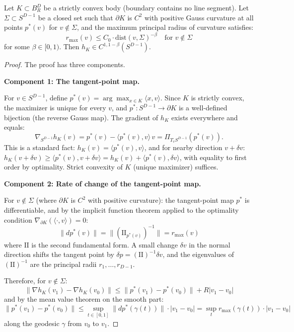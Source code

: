 \begin{theorem}
\label{thm:curv-reg-sc}
Let $K \subset B_R^D$ be a strictly convex body (boundary contains no line segment). Let $\Sigma \subset S^{D-1}$ be a closed set such that $\partial K$ is $C^2$ with positive Gauss curvature at all points $p^*(v)$ for $v \notin \Sigma$, and the maximum principal radius of curvature satisfies:
\[
  r_{\max}(v) \leq C_0 \cdot \mathrm{dist}(v, \Sigma)^{-\beta} \quad \text{for } v \notin \Sigma
\]
for some $\beta \in [0, 1)$. Then $h_K \in C^{1, 1-\beta}(S^{D-1})$.
\end{theorem}

\begin{proof}
The proof has three components.

\textbf{Component 1: The tangent-point map.}

For $v \in S^{D-1}$, define $p^*(v) = \arg\max_{x \in K} \langle x, v \rangle$. Since $K$ is strictly convex, the maximizer is unique for every $v$, and $p^* : S^{D-1} \to \partial K$ is a well-defined bijection (the reverse Gauss map). The gradient of $h_K$ exists everywhere and equals:
\[
  \nabla_{S^{D-1}} h_K(v) = p^*(v) - \langle p^*(v), v \rangle \, v = \Pi_{T_v S^{D-1}}(p^*(v)).
\]
This is a standard fact: $h_K(v) = \langle p^*(v), v \rangle$, and for nearby direction $v + \delta v$: $h_K(v + \delta v) \geq \langle p^*(v), v + \delta v \rangle = h_K(v) + \langle p^*(v), \delta v \rangle$, with equality to first order by optimality. Strict convexity of $K$ (unique maximizer) suffices.

\textbf{Component 2: Rate of change of the tangent-point map.}

For $v \notin \Sigma$ (where $\partial K$ is $C^2$ with positive curvature): the tangent-point map $p^*$ is differentiable, and by the implicit function theorem applied to the optimality condition $\nabla_{\partial K}(\langle \cdot, v \rangle) = 0$:
\[
  \|dp^*(v)\| = \|(\mathrm{II}_{p^*(v)})^{-1}\| = r_{\max}(v)
\]
where $\mathrm{II}$ is the second fundamental form. A small change $\delta v$ in the normal direction shifts the tangent point by $\delta p = (\mathrm{II})^{-1} \delta v$, and the eigenvalues of $(\mathrm{II})^{-1}$ are the principal radii $r_1, \ldots, r_{D-1}$.

Therefore, for $v \notin \Sigma$:
\[
  \|\nabla h_K(v_1) - \nabla h_K(v_0)\| \leq \|p^*(v_1) - p^*(v_0)\| + R |v_1 - v_0|
\]
and by the mean value theorem on the smooth part:
\[
  \|p^*(v_1) - p^*(v_0)\| \leq \sup_{t \in [0,1]} \|dp^*(\gamma(t))\| \cdot |v_1 - v_0| = \sup_t r_{\max}(\gamma(t)) \cdot |v_1 - v_0|
\]
along the geodesic $\gamma$ from $v_0$ to $v_1$.


\end{proof}
